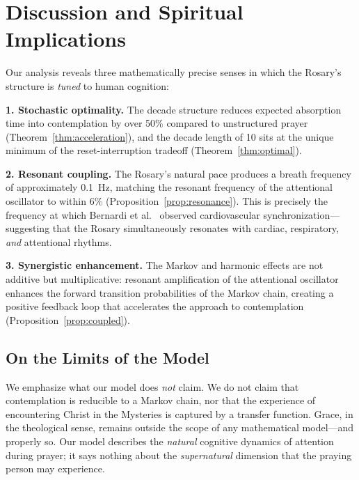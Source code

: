 \documentclass[journal]{IEEEtran}
\theoremstyle{definition}
\theoremstyle{remark}
\begin{document}
\section{Discussion and Spiritual Implications}\label{sec:discussion}

Our analysis reveals three mathematically precise senses in which the Rosary's structure is \emph{tuned} to human cognition:

\textbf{1. Stochastic optimality.} The decade structure reduces expected absorption time into contemplation by over 50\% compared to unstructured prayer (Theorem~\ref{thm:acceleration}), and the decade length of 10 sits at the unique minimum of the reset-interruption tradeoff (Theorem~\ref{thm:optimal}).

\textbf{2. Resonant coupling.} The Rosary's natural pace produces a breath frequency of approximately 0.1~Hz, matching the resonant frequency of the attentional oscillator to within 6\% (Proposition~\ref{prop:resonance}). This is precisely the frequency at which Bernardi et al.~\cite{bernardi2001} observed cardiovascular synchronization---suggesting that the Rosary simultaneously resonates with cardiac, respiratory, \emph{and} attentional rhythms.

\textbf{3. Synergistic enhancement.} The Markov and harmonic effects are not additive but multiplicative: resonant amplification of the attentional oscillator enhances the forward transition probabilities of the Markov chain, creating a positive feedback loop that accelerates the approach to contemplation (Proposition~\ref{prop:coupled}).

\subsection{On the Limits of the Model}

We emphasize what our model does \emph{not} claim. We do not claim that contemplation is reducible to a Markov chain, nor that the experience of encountering Christ in the Mysteries is captured by a transfer function. Grace, in the theological sense, remains outside the scope of any mathematical model---and properly so. Our model describes the \emph{natural} cognitive dynamics of attention during prayer; it says nothing about the \emph{supernatural} dimension that the praying person may experience.
\end{document}

